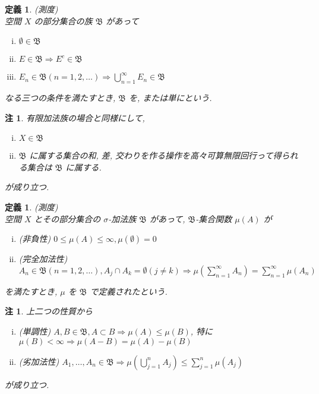 \documentclass[dvipdfmx]{jsreport}
\newtheorem{defi}[theo]{定義}
\newtheorem{rema}[theo]{注}
\begin{document}
\begin{defi}
    (測度) \\
    空間 $X$ の部分集合の族 $\mathfrak{B}$ があって
    \begin{enumerate}[(i)]
        \item $\emptyset \in \mathfrak{B}$
        \item $E \in \mathfrak{B} \Rightarrow E^c \in \mathfrak{B}$
        \item $\displaystyle E_n \in \mathfrak{B} (n = 1, 2, \dots) \Rightarrow \bigcup_{n = 1}^\infty E_n \in \mathfrak{B}$
    \end{enumerate}
    なる三つの条件を満たすとき, $\mathfrak{B}$ を, または単にという. 
\end{defi}

\begin{rema}
    有限加法族の場合と同様にして, 
    \begin{enumerate}[(i)]
        \item $X \in \mathfrak{B}$
        \item $\mathfrak{B}$ に属する集合の和, 差, 交わりを作る操作を高々可算無限回行って得られる集合は $\mathfrak{B}$ に属する. 
    \end{enumerate}
    が成り立つ. 
\end{rema}

\begin{defi}
    (測度) \\
    空間 $X$ とその部分集合の $\sigma$-加法族 $\mathfrak{B}$ があって, $\mathfrak{B}$-集合関数 $\mu(A)$ が
    \begin{enumerate}[(i)]
        \item (非負性) $0 \leq \mu(A) \leq \infty, \mu(\emptyset) = 0 $
        \item (完全加法性) $\displaystyle A_n \in \mathfrak{B} (n = 1, 2, \dots), A_j \cap A_k = \emptyset (j \neq k) \Rightarrow \mu\left( \sum_{n = 1}^\infty A_n \right) = \sum_{n = 1}^\infty \mu(A_n)$
    \end{enumerate}
    を満たすとき, $\mu$ を $\mathfrak{B}$ で定義されたという. 
\end{defi}
\begin{rema}
    上二つの性質から
    \begin{enumerate}[(i)]
        \item (単調性) $A, B \in \mathfrak{B}, A \subset B \Rightarrow \mu(A) \leq \mu(B)$, 特に $\mu(B) < \infty \Rightarrow \mu(A - B) = \mu(A) - \mu(B)$
        \item (劣加法性) $\displaystyle A_1, \dots, A_n \in \mathfrak{B} \Rightarrow \mu\left( \bigcup_{j = 1}^n A_j \right) \leq \sum_{j = 1}^n \mu(A_j)$
    \end{enumerate}
    が成り立つ. 
\end{rema}
\end{document}
